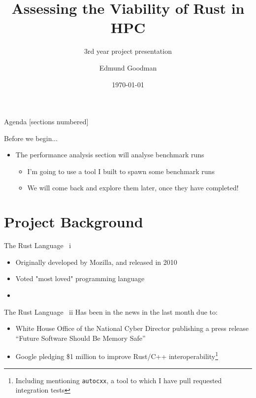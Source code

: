 \documentclass[10pt,aspectratio=169]{beamer}
\title{Assessing the Viability of Rust in HPC}
\subtitle{3rd year project presentation}
\author{Edmund Goodman}
\date{\today}
\begin{document}
\maketitle

\begin{frame}{Agenda}
  [sections numbered]
  \tableofcontents%
\end{frame}

\begin{frame}{Before we begin...}
\begin{itemize}
    \item<1-> The performance analysis section will analyse benchmark runs
    \begin{itemize}
        \item<2-> I'm going to use a tool I built to spawn some benchmark runs
        \item<3-> We will come back and explore them later, once they have completed!
    \end{itemize}
\end{itemize}
\end{frame}

\section{Project Background}

\begin{frame}{The Rust Language \ i}
    \begin{itemize}
        \item Originally developed by Mozilla, and released in 2010
        \item Voted "most loved" programming language
        \item 
    \end{itemize}
\end{frame}

\begin{frame}{The Rust Language \ ii}
    Has been in the news in the last month due to:
    \begin{itemize}
        \item White House Office of the National Cyber Director publishing a press release ``Future Software Should Be Memory Safe'' \cite{PressReleaseFuture2024}  %
        \item Google pledging \$1 million to improve Rust/C++ interoperability\footnote{Including mentioning \texttt{autocxx}, a tool to which I have pull requested integration tests}\cite{ImprovingInteroperabilityRust}  %
    \end{itemize}
\end{frame}
\end{document}
